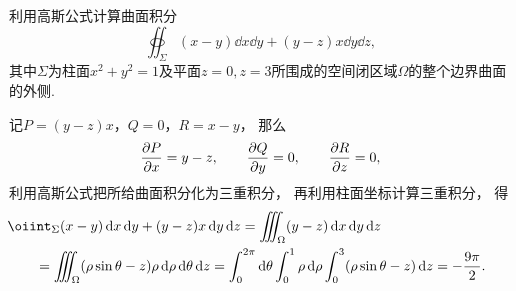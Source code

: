 \begin{example}
利用高斯公式计算曲面积分\begin{equation*}
	\oiint_\Sigma (x-y) \dd{x}\dd{y} + (y-z)x \dd{y}\dd{z},
\end{equation*}
其中\(\Sigma\)为柱面\(x^2+y^2=1\)及平面\(z=0,z=3\)所围成的空间闭区域\(\Omega\)的整个边界曲面的外侧.
\begin{solution}
记\(P=(y-z)x\)，\(Q=0\)，\(R=x-y\)，
那么\begin{equation*}
	\pdv{P}{x} = y-z,
	\qquad
	\pdv{Q}{y} = 0,
	\qquad
	\pdv{R}{z} = 0,
\end{equation*}
利用高斯公式把所给曲面积分化为三重积分，
再利用柱面坐标计算三重积分，
得\begin{align*}
	&\hspace{-20pt}\oiint_\Sigma (x-y) \dd{x}\dd{y} + (y-z)x \dd{y}\dd{z}
	= \iiint_\Omega (y-z) \dd{x}\dd{y}\dd{z} \\
	&= \iiint_\Omega (\rho\sin\theta-z)\rho\dd{\rho}\dd{\theta}\dd{z}
	= \int_0^{2\pi} \dd{\theta} \int_0^1 \rho\dd{\rho} \int_0^3 (\rho\sin\theta-z) \dd{z}
	= -\frac{9\pi}{2}.
\end{align*}
\end{solution}
\end{example}


